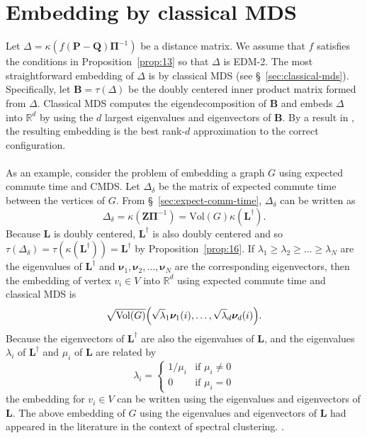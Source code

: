 \section{Embedding by classical MDS}
\label{sec:embedd-class-mds}
Let $\Delta = \kappa(f(\mathbf{P} - \mathbf{Q})\bm{\Pi}^{-1})$ be a
distance matrix. We assume that $f$ satisfies the conditions in
Proposition~\ref{prop:13} so that $\Delta$ is EDM-2. The most
straightforward embedding of $\Delta$ is by classical MDS (see
\S~\ref{sec:classical-mds}). Specifically, let $\mathbf{B} =
\tau(\Delta)$ be the doubly centered inner product matrix formed from
$\Delta$. Classical MDS computes the eigendecomposition of
$\mathbf{B}$ and embeds $\Delta$ into $\mathbb{R}^{d}$ by using the
$d$ largest eigenvalues and eigenvectors of $\mathbf{B}$. By a result
in \cite{eckart36:_approx}, the resulting embedding is the
best rank-$d$ approximation to the correct configuration. \\ \\
\noindent
As an example, consider the problem of embedding a graph $G$ using
expected commute time and CMDS\@. Let $\Delta_\delta$ be the
matrix of expected commute time between the vertices of $G$. From
\S~\ref{sec:expect-comm-time}, $\Delta_{\delta}$ can be written as
\begin{equation*}
  \Delta_{\delta} = \kappa(\mathbf{Z}\bm{\Pi}^{-1}) = \mathrm{Vol}(G)
  \kappa(\mathbf{L}^{\dagger}).
\end{equation*}
Because $\mathbf{L}$ is doubly centered, $\mathbf{L}^{\dagger}$ is
also doubly centered and so $\tau(\Delta_{\delta}) =
\tau(\kappa(\mathbf{L}^{\dagger})) = \mathbf{L}^{\dagger}$ by
Proposition~\ref{prop:16}. If $\lambda_1 \geq \lambda_2 \geq \dots \geq
\lambda_N$ are the eigenvalues of $\mathbf{L}^{\dagger}$ and
$\bm{\nu}_1, \bm{\nu}_2, \dots, \bm{\nu}_N$ are the corresponding
eigenvectors, then the embedding of vertex $v_i \in V$ into
$\mathbb{R}^{d}$ using expected commute time and classical MDS is
\begin{equation}
  \label{eq:33}
  \sqrt{\mathrm{Vol}(G)} 
\Bigl(\sqrt{\lambda}_1 \bm{\nu}_1(i), \dots, \sqrt{\lambda}_d
\bm{\nu}_d(i) \Bigr).
\end{equation}
Because the eigenvectors of $\mathbf{L}^{\dagger}$ are also the
eigenvalues of $\mathbf{L}$, and the eigenvalues $\lambda_i$ of  
$\mathbf{L}^{\dagger}$ and $\mu_i$ of $\mathbf{L}$ are related by
\begin{equation}
  \label{eq:53}
  \lambda_i = \begin{cases}
    1/\mu_i & \text{if $\mu_i \not = 0$} \\
    0 & \text{if $\mu_i = 0$}
    \end{cases}
\end{equation}
the embedding for $v_i \in V$ can be written using the eigenvalues and
eigenvectors of $\mathbf{L}$. The above embedding of $G$ using the
eigenvalues and eigenvectors of $\mathbf{L}$ had appeared in the
literature in the context of spectral clustering.
\citep{yen07:_graph,luxburg07:_tutor_spect_clust}.
